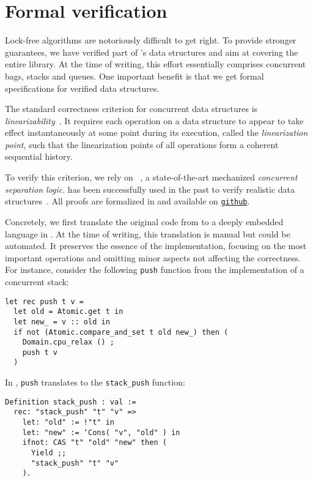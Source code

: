 \documentclass[a4paper, 11pt]{article}
\begin{document}
\section{Formal verification}
\label{sec:verification}

Lock-free algorithms are notoriously difficult to get right.
To provide stronger guarantees, we have verified part of \Saturn's data structures and aim at covering the entire library.
At the time of writing, this effort essentially comprises concurrent bags, stacks and queues.
One important benefit is that we get formal specifications for verified data structures.

The standard correctness criterion for concurrent data structures is \emph{linearizability}~\cite{DBLP:journals/toplas/HerlihyW90}.
It requires each operation on a data structure to appear to take effect instantaneously at some point during its execution, called the \emph{linearization point}, such that the linearization points of all operations form a coherent sequential history.

To verify this criterion, we rely on \Iris~\cite{DBLP:journals/jfp/JungKJBBD18}, a state-of-the-art mechanized \emph{concurrent separation logic}.
\Iris has been successfully used in the past to verify realistic data structures~\cite{DBLP:conf/cpp/VindumB21, DBLP:conf/cpp/VindumFB22, DBLP:journals/pacmpl/MevelJ21}.
All proofs are formalized in \Coq and available on \href{https://github.com/clef-men/zoo}{\texttt{github}}.

Concretely, we first translate the original code from \Saturn to a deeply embedded language in \Coq.
At the time of writing, this translation is manual but could be automated.
It preserves the essence of the implementation, focusing on the most important operations and omitting minor aspects not affecting the correctness.
For instance, consider the following \texttt{push} function from the implementation of a concurrent stack:

\begin{verbatim}
let rec push t v =
  let old = Atomic.get t in
  let new_ = v :: old in
  if not (Atomic.compare_and_set t old new_) then (
    Domain.cpu_relax () ;
    push t v
  )
\end{verbatim}

In \Coq, \texttt{push} translates to the \texttt{stack\_push} function:

\begin{verbatim}
Definition stack_push : val :=
  rec: "stack_push" "t" "v" =>
    let: "old" := !"t" in
    let: "new" := ‘Cons( "v", "old" ) in
    ifnot: CAS "t" "old" "new" then (
      Yield ;;
      "stack_push" "t" "v"
    ).
\end{verbatim}
\end{document}
